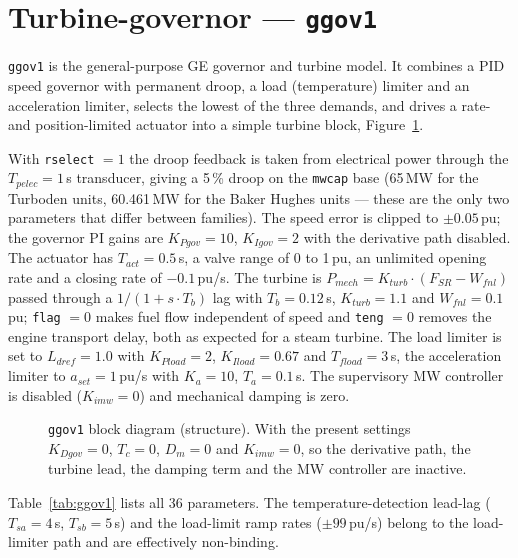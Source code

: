 \section{Turbine-governor --- \texttt{ggov1}}
\label{sec:ggov1}

\texttt{ggov1} is the general-purpose GE governor and turbine model. It combines a
PID speed governor with permanent droop, a load (temperature) limiter and an
acceleration limiter, selects the lowest of the three demands, and drives a rate- and
position-limited actuator into a simple turbine block, Figure~\ref{fig:ggov1}.

With \texttt{rselect} $= 1$ the droop feedback is taken from electrical power through
the $T_{pelec} = 1$\,s transducer, giving a 5\,\% droop on the \texttt{mwcap} base
(65\,MW for the Turboden units, 60.461\,MW for the Baker Hughes units --- these are
the only two parameters that differ between families). The speed error is clipped to
$\pm0.05$\,pu; the governor PI gains are $K_{Pgov} = 10$, $K_{Igov} = 2$ with the
derivative path disabled. The actuator has $T_{act} = 0.5$\,s, a valve range of 0 to
1\,pu, an unlimited opening rate and a closing rate of $-0.1$\,pu/s. The turbine is
$P_{mech} = K_{turb} \cdot (F_{SR} - W_{fnl})$ passed through a $1/(1 + s \cdot T_b)$
lag with $T_b = 0.12$\,s, $K_{turb} = 1.1$ and $W_{fnl} = 0.1$\,pu; \texttt{flag} $= 0$
makes fuel flow independent of speed and \texttt{teng} $= 0$ removes the engine
transport delay, both as expected for a steam turbine. The load limiter is set to
$L_{dref} = 1.0$ with $K_{Pload} = 2$, $K_{Iload} = 0.67$ and $T_{fload} = 3$\,s, the
acceleration limiter to $a_{set} = 1$\,pu/s with $K_a = 10$, $T_a = 0.1$\,s. The
supervisory MW controller is disabled ($K_{imw} = 0$) and mechanical damping is zero.

\begin{figure}[!ht]
\centering
\resizebox{\linewidth}{!}{}
\caption{\texttt{ggov1} block diagram (structure). With the present settings $K_{Dgov} = 0$, $T_c = 0$, $D_m = 0$ and $K_{imw} = 0$, so the derivative path, the turbine lead, the damping term and the MW controller are inactive.}
\label{fig:ggov1}
\end{figure}

Table~\ref{tab:ggov1} lists all 36 parameters. The temperature-detection lead-lag
($T_{sa} = 4$\,s, $T_{sb} = 5$\,s) and the load-limit ramp rates ($\pm99$\,pu/s)
belong to the load-limiter path and are effectively non-binding.

\begin{table}[!ht]
\centering

\caption{\texttt{ggov1} parameters (pu on \texttt{mwcap} base unless noted).}
\label{tab:ggov1}
\end{table}
